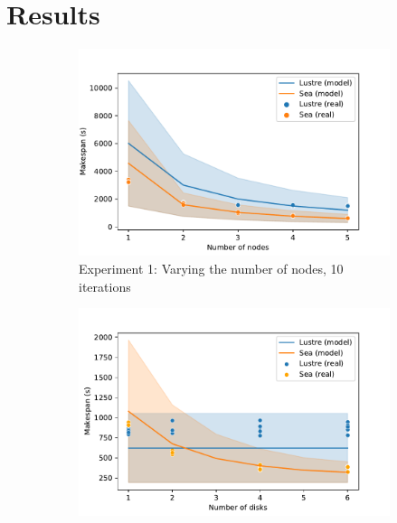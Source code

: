 
\section{Results}

    \begin{figure}

    \begin{subfigure}{0.5\columnwidth}
        \centering
        \captionsetup{width=.85\linewidth}
        \includegraphics[width=\columnwidth]{figures/sea-comp/nodes.pdf}%
        \caption{Experiment 1: Varying the number of nodes, 10
        iterations}\label{fig:sea-comp:nodes}
    \end{subfigure}
    \begin{subfigure}{0.5\columnwidth}
        \centering
        \captionsetup{width=.85\linewidth}
        \includegraphics[width=\linewidth]{figures/sea-comp/disks.pdf}

\end{subfigure}
\end{figure}
